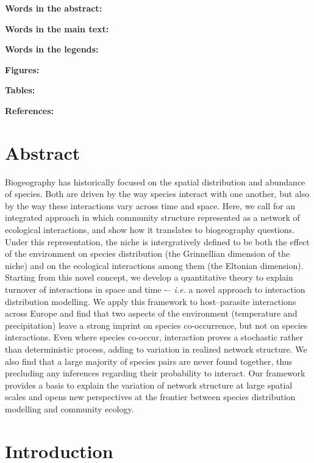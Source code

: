 \documentclass[12pt]{article}
\begin{document}
\textbf{Words in the abstract:}

\textbf{Words in the main text:}

\textbf{Words in the legends:}

\textbf{Figures:}

\textbf{Tables:}

\textbf{References:}

\newpage
\doublespacing

\section*{Abstract}

Biogeography has historically focused on the spatial distribution and abundance
of species. Both are driven by the way species interact with one another,
but also by the way these interactions vary across time and space. Here,
we call for an integrated approach in which community structure represented
as a network of ecological interactions, and show how it translates to
biogeography questions. Under this representation, the niche is intergratively
defined to be both the effect of the environment on species distribution (the
Grinnellian dimension of the niche) and on the ecological interactions among
them (the Eltonian dimension). Starting from this novel concept, we develop a
quantitative theory to explain turnover of interactions in space and time -–
\emph{i.e.} a novel approach to interaction distribution modelling. We apply
this framework to host–parasite interactions across Europe and find that
two aspects of the environment (temperature and precipitation) leave a strong
imprint on species co-occurrence, but not on species interactions. Even where
species co-occur, interaction proves a stochastic rather than deterministic
process, adding to variation in realized network structure. We also find
that a large majority of species pairs are never found together, thus
precluding any inferences regarding their probability to interact. Our
framework provides a basis to explain the variation of network structure
at large spatial scales and opens new perspectives at the frontier between
species distribution modelling and community ecology.

\newpage

\section*{Introduction}
\end{document}
